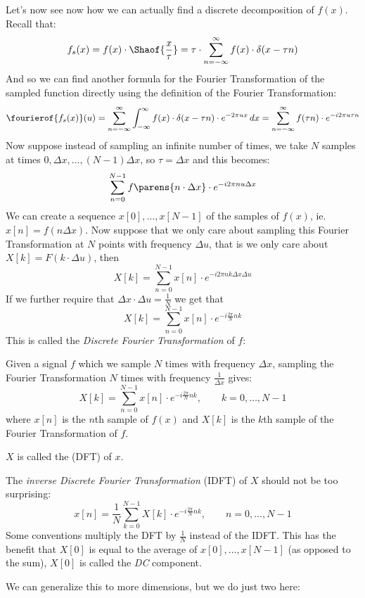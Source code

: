 \documentclass[10pt]{article}
\begin{document}
Let's now see now how we can actually find a discrete decomposition of $f(x)$.
Recall that:
\[ f_s(x) = f(x)\cdot\Shaof{\frac x\tau} = \tau\cdot\sum_{n=-\infty}^\infty f(x)\cdot\delta(x-\tau n) \]
And so we can find another formula for the Fourier Transformation of the sampled function directly using the definition of the Fourier Transformation:
\[ \fourierof{f_s(x)}(u) = \sum_{n=-\infty}^\infty\int_{-\infty}^\infty f(x)\cdot\delta(x-\tau n)\cdot e^{-2\pi ux}\,dx = \sum_{n=-\infty}^\infty f(\tau n)\cdot e^{-i2\pi u\tau n} \]
Now suppose instead of sampling an infinite number of times, we take $N$ samples at times $0,\Delta x,\dots,(N-1)\Delta x$, so $\tau=\Delta x$ and this becomes:
\[ \sum_{n=0}^{N-1} f\parens{n\cdot\Delta x}\cdot e^{-i2\pi nu\Delta x} \]
We can create a sequence $x[0],\dots,x[N-1]$ of the samples of $f(x)$, ie. $x[n]=f(n\Delta x)$.
Now suppose that we only care about sampling this Fourier Transformation at $N$ points with frequency $\Delta u$, that is we only care about $X[k]=F(k\cdot\Delta u)$, then
\[ X[k] = \sum_{n=0}^{N-1} x[n]\cdot e^{-i2\pi nk\Delta x\Delta u} \]
If we further require that $\Delta x\cdot\Delta u=\frac1N$ we get that
\[ X[k] = \sum_{n=0}^{N-1} x[n]\cdot e^{-i\frac{2\pi}Nnk} \]
This is called the \emph{Discrete Fourier Transformation} of $f$:

\begin{defn*}

    Given a signal $f$ which we sample $N$ times with frequency $\Delta x$, sampling the Fourier Transformation $N$ times with frequency $\frac1{\Delta x}$ gives:
    \[ X[k] = \sum_{n=0}^{N-1} x[n]\cdot e^{-i\frac{2\pi}Nnk},\qquad k=0,\dots,N-1 \]
    where $x[n]$ is the $n$th sample of $f(x)$ and $X[k]$ is the $k$th sample of the Fourier Transformation of $f$.

    $X$ is called the  (DFT) of $x$.

\end{defn*}

The \emph{inverse Discrete Fourier Transformation} (IDFT) of $X$ should not be too surprising:
\[ x[n] = \frac1N\sum_{k=0}^{N-1} X[k]\cdot e^{-i\frac{2\pi}Nnk},\qquad n=0,\dots,N-1 \]
Some conventions multiply the DFT by $\frac1N$ instead of the IDFT.
This has the benefit that $X[0]$ is equal to the average of $x[0],\dots,x[N-1]$ (as opposed to the sum), $X[0]$ is called the \emph{DC} component.

We can generalize this to more dimensions, but we do just two here:
\end{document}
